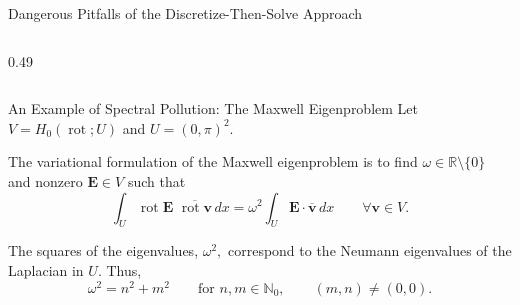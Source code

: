 \documentclass[aspectratio=169]{beamer}
\begin{document}
\begin{frame}{Dangerous Pitfalls of the Discretize-Then-Solve Approach}
\begin{columns}[T,onlytextwidth]
\begin{column}{0.49\textwidth}
{%
}
\end{column}
\end{columns}

\end{frame}

\begin{frame}{An Example of Spectral Pollution: The Maxwell Eigenproblem}
Let $V = H_0(\operatorname{rot};U)$ and $U = (0, \pi)^2.$

\vspace{1em}

The variational formulation of the Maxwell eigenproblem is to find $\omega\in\mathbb R\setminus\{0\}$ and nonzero $\mathbf E \in V$ such that
$$\int_{U} \operatorname{rot}\mathbf E \,\, \overline{\operatorname{rot}\mathbf v} \, dx = \omega^2 \int_{U} \mathbf E \cdot \overline{\mathbf v} \, dx \qquad
\forall \mathbf v\in V.
$$

\vspace{1em}

The squares of the eigenvalues, $\omega^2,$ correspond to the Neumann eigenvalues of the Laplacian in $U.$ Thus,
$$ \omega^2 = n^2 + m^2 \qquad \text{for } n, m \in \mathbb{N}_0, \qquad (m,n) \ne (0, 0).$$ 
\end{frame}
\end{document}
